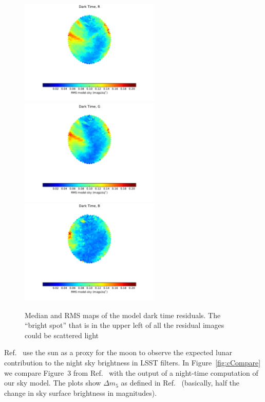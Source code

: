 \documentclass[]{spie}
\begin{document}
\begin{figure}[ht]
\begin{center}
  \includegraphics[height=5cm]{plots/stdResidMap_R.pdf}\includegraphics[height=5cm]{plots/stdResidMap_g.pdf}\includegraphics[height=5cm]{plots/stdResidMap_b.pdf}
  \end{center}
  \caption{Median and RMS maps of the model dark time residuals. The ``bright spot'' that is in the upper left of all the residual images could be scattered light }
\end{figure}


Ref.~ use the sun as a proxy for the moon to observe the expected lunar contribution to the night sky brightness in LSST filters. In Figure~\ref{fig:cCompare} we compare Figure~3 from Ref.~ with the output of a night-time computation of our sky model.  The plots show $\Delta m_5$ as defined in Ref.~ (basically, half the change in sky surface brightness in magnitudes).  
\end{document}
